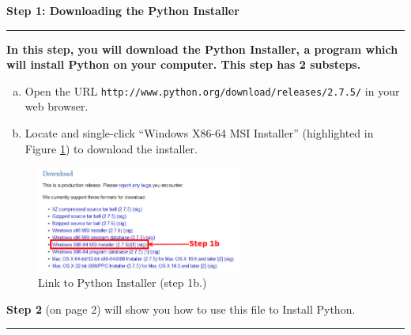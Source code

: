 \documentclass[11pt,english]{article}
\newcommand{\myhrule}{\vspace{0.3cm}\hrule\vspace{0.3cm}}
\begin{document}
{\Large {\bf Step 1: Downloading the Python Installer}}
\myhrule
{\bf In this step, you will download the Python Installer, a program which will
install Python on your computer. This step has 2 substeps.}
\begin{enumerate}[a.]
\item Open the URL \texttt{http://www.python.org/download/releases/2.7.5/} in
your web browser.
\item Locate and single-click ``Windows X86-64 MSI Installer'' (highlighted in
Figure \ref{fig:dia1}) to download the installer.
\end{enumerate}
\begin{figure}[h]
\begin{center}
\includegraphics[width=0.6\textwidth]{dia1}
\end{center}
\caption{Link to Python Installer (step 1b.)}
\label{fig:dia1}
\end{figure}
\vfill
{\bf Step 2} (on page 2) will show you how to use this file to Install Python.
\myhrule
\end{document}
